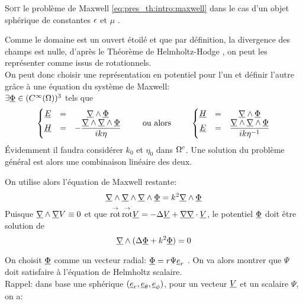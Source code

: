 \lettrine{S}{oit} le problème de Maxwell \eqref{eq:pres_th:intro:maxwell} dans le cas d'un objet sphérique de constantes $\epsilon$ et $\mu$%
.

Comme le domaine est un ouvert étoilé et que par définition, la divergence des champs est nulle, d'après le Théorème de Helmholtz-Hodge \cite{gui_rigorous_2007}, on peut les représenter comme issus de rotationnels.\\
On peut donc choisir une représentation en potentiel pour l'un et définir l'autre grâce à une équation du système de Maxwell:\\
 $\exists \underline{\Phi} \in (C^\infty(\Omega))^3$ tels que
\begin{equation}
  \label{eq:sol_maxwell:pot_hertz}
  \left\lbrace\begin{matrix}
    \underline{E} &=& \underline{\nabla} \wedge \underline{\Phi} \\
    \underline{H} &=& - \dfrac{\underline{\nabla} \wedge \underline{\nabla} \wedge \underline{\Phi}}{ik\eta}
  \end{matrix} \right.
  \qquad \text{ ou alors } \qquad
  \left\lbrace\begin{matrix}
    \underline{H} &=& \underline{\nabla} \wedge \underline{\Phi}\\
    \underline{E} &=& \dfrac{\underline{\nabla} \wedge \underline{\nabla} \wedge \underline{\Phi}}{ik\eta^{-1}}\\
  \end{matrix}\right.
\end{equation}
Évidemment il faudra considérer $k_0$ et $\eta_0$ dans $\Omega^c$. Une solution du problème général est alors une combinaison linéaire des deux.

On utilise alors l'équation de Maxwell restante:
\[
    \underline{\nabla} \wedge \underline{\nabla} \wedge \underline{\nabla} \wedge \underline{\Phi} = k^2 \underline{\nabla} \wedge \underline{\Phi} \\
\]
Puisque $\underline{\nabla} \wedge  \underline{\nabla}  V  \equiv 0$ et que ${{\overset{\rightarrow}{\operatorname{rot}}}}\, {{\overset{\rightarrow}{\operatorname{rot}}}} \underline{V} = -\Delta \underline{V} + \underline{\nabla} \underline{\nabla} \cdot \underline{V}$, le potentiel $\underline{\Phi}$ doit être solution de 
\begin{equation}
  \label{eq:sol_maxwell:helmholtz_vect}
  \underline{\nabla} \wedge ( \Delta \underline{\Phi} + k^2 \underline{\Phi} ) = 0
\end{equation}

On choisit $\underline{\Phi}$ comme un vecteur radial: $\underline{\Phi} = r \Psi \underline{e}_r$ \cite[p.~84]{bohren_absorption_2004}. On va alors montrer que $\Psi$ doit satisfaire à l'équation de Helmholtz scalaire.\\

Rappel: dans base une sphérique $(\underline{e}_r, \underline{e}_\theta, \underline{e}_\phi)$, pour 
un vecteur $\underline{V}$ 
et un scalaire $\Psi$, on a:

